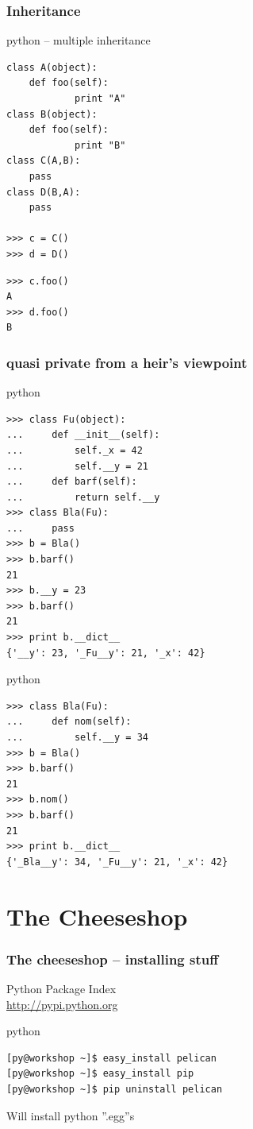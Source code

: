 \documentclass{beamer}
\begin{document}
\begin{frame}[fragile]
	\frametitle{Inheritance}
	\begin{exampleblock}{python -- multiple inheritance}
	\begin{lstlisting}
class A(object):
    def foo(self):
            print "A"
class B(object):
    def foo(self):
            print "B"
class C(A,B):
    pass
class D(B,A):
    pass

>>> c = C()
>>> d = D()
    \end{lstlisting}
\pause
	\begin{lstlisting}
>>> c.foo()
A
>>> d.foo()
B	
	\end{lstlisting}
	\end{exampleblock}
\end{frame}

\begin{frame}
	\frametitle{quasi private from a heir's viewpoint}
	\begin{exampleblock}{python}
	\begin{lstlisting}
>>> class Fu(object):
...     def __init__(self):
...         self._x = 42
...         self.__y = 21
...     def barf(self):
...         return self.__y
>>> class Bla(Fu):
...     pass
>>> b = Bla()
>>> b.barf()
21
>>> b.__y = 23
>>> b.barf()
21
>>> print b.__dict__
{'__y': 23, '_Fu__y': 21, '_x': 42}
	\end{lstlisting}
	\end{exampleblock}
\framebreak
	\begin{exampleblock}{python}
	\begin{lstlisting}
>>> class Bla(Fu):
...     def nom(self):
...         self.__y = 34
>>> b = Bla()
>>> b.barf()
21
>>> b.nom()
>>> b.barf()
21
>>> print b.__dict__
{'_Bla__y': 34, '_Fu__y': 21, '_x': 42}
	\end{lstlisting}
	\end{exampleblock}
\end{frame}




\section{The Cheeseshop}	%

\begin{frame}[fragile]
	\frametitle{The cheeseshop -- installing stuff}
	Python Package Index\\
	\url{http://pypi.python.org}
	\begin{exampleblock}{python}
	\begin{lstlisting}[language=bash]
[py@workshop ~]$ easy_install pelican
[py@workshop ~]$ easy_install pip
[py@workshop ~]$ pip uninstall pelican
	\end{lstlisting}
	\end{exampleblock}
	
	Will install python ''.egg''s
\end{frame}
\end{document}
